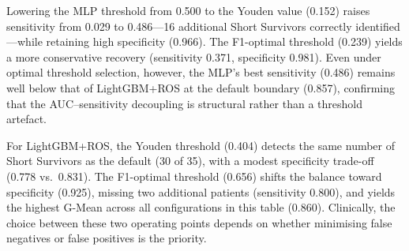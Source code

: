 \documentclass[preprint,12pt]{elsarticle}
\begin{document}
\begin{table}[ht!]
  \caption{Test-set performance under three decision thresholds for MLP+None and
    LightGBM+ROS. Thresholds marked $\dagger$ were derived from out-of-fold CV
    predictions; the 0.50 row is the unmodified baseline from Table~\ref{tab:test}.
    The sensitivity-constrained strategy ($\geq 0.90$) returned degenerate thresholds
    ($\approx\!0$) for both classifiers, collapsing to predicting all patients as Short
    Survivors; it is excluded. TP\,/\,FN counts are out of 35 Short Survivors.}
  \label{tab:threshold}
\end{table}

Lowering the MLP threshold from 0.500 to the Youden value (0.152) raises
sensitivity from 0.029 to 0.486---16 additional Short Survivors correctly
identified---while retaining high specificity (0.966). The F1-optimal threshold
(0.239) yields a more conservative recovery (sensitivity 0.371, specificity 0.981).
Even under optimal threshold selection, however, the MLP's best sensitivity (0.486)
remains well below that of LightGBM+ROS at the default boundary (0.857),
confirming that the AUC--sensitivity decoupling is structural rather than a
threshold artefact.

For LightGBM+ROS, the Youden threshold (0.404) detects the same number of Short
Survivors as the default (30 of 35), with a modest specificity trade-off (0.778
vs.\ 0.831). The F1-optimal threshold (0.656) shifts the balance toward specificity
(0.925), missing two additional patients (sensitivity 0.800), and yields the highest
G-Mean across all configurations in this table (0.860). Clinically, the choice
between these two operating points depends on whether minimising false negatives
or false positives is the priority.
\end{document}
